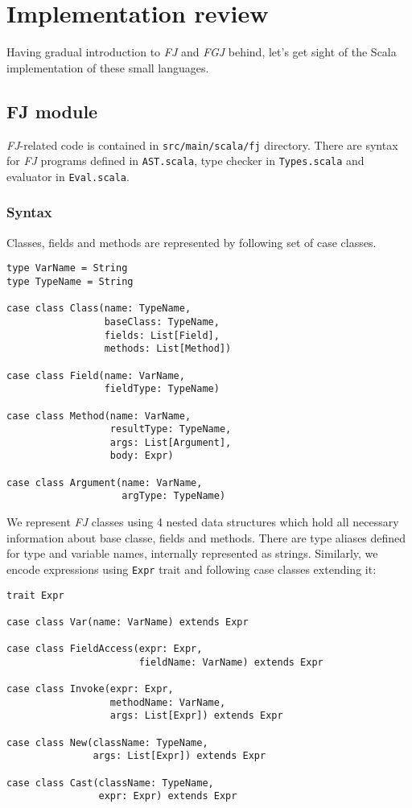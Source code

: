 \documentclass{article}[12pt]
\begin{document}
\section{Implementation review}

Having gradual introduction to \emph{FJ} and \emph{FGJ} behind,
let's get sight of the Scala implementation of these small languages.

\subsection{FJ module}

\emph{FJ}-related code is contained in \texttt{src/main/scala/fj}
directory. There are syntax for \emph{FJ} programs defined in
\texttt{AST.scala}, type checker in \texttt{Types.scala} and
evaluator in \texttt{Eval.scala}.

\subsubsection{Syntax}

Classes, fields and methods are represented by following set of
case classes.

\begin{verbatim}
type VarName = String
type TypeName = String

case class Class(name: TypeName,
                 baseClass: TypeName,
                 fields: List[Field],
                 methods: List[Method])

case class Field(name: VarName,
                 fieldType: TypeName)

case class Method(name: VarName,
                  resultType: TypeName,
                  args: List[Argument],
                  body: Expr)

case class Argument(name: VarName,
                    argType: TypeName)
\end{verbatim}

We represent \emph{FJ} classes using 4 nested data structures
which hold all necessary information about base classe, fields
and methods. There are type aliases defined for type and variable
names, internally represented as strings. Similarly, we encode
expressions using \texttt{Expr} trait and following case classes
extending it:

\begin{verbatim}
trait Expr

case class Var(name: VarName) extends Expr

case class FieldAccess(expr: Expr,
                       fieldName: VarName) extends Expr

case class Invoke(expr: Expr,
                  methodName: VarName,
                  args: List[Expr]) extends Expr

case class New(className: TypeName,
               args: List[Expr]) extends Expr

case class Cast(className: TypeName,
                expr: Expr) extends Expr
\end{verbatim}
\end{document}
